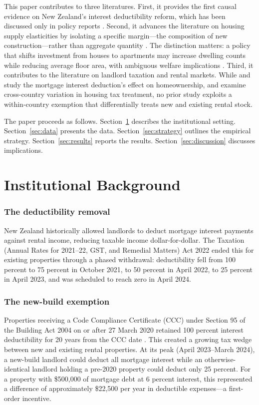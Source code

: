 \documentclass[12pt]{article}
\begin{document}
This paper contributes to three literatures. First, it provides the first causal evidence on New Zealand's interest deductibility reform, which has been discussed only in policy reports \citep{MBIE2023, RBNZ2022}. Second, it advances the literature on housing supply elasticities by isolating a specific margin---the composition of new construction---rather than aggregate quantity \citep{Saiz2010, GlaeserGyourko2005}. The distinction matters: a policy that shifts investment from houses to apartments may increase dwelling counts while reducing average floor area, with ambiguous welfare implications \citep{Albouy2016}. Third, it contributes to the literature on landlord taxation and rental markets. While \citet{GlaeserShapiro2003} and \citet{HilberTurner2014} study the mortgage interest deduction's effect on homeownership, and \citet{FaticaPrammer2018} examine cross-country variation in housing tax treatment, no prior study exploits a within-country exemption that differentially treats new and existing rental stock.

The paper proceeds as follows. Section~\ref{sec:background} describes the institutional setting. Section~\ref{sec:data} presents the data. Section~\ref{sec:strategy} outlines the empirical strategy. Section~\ref{sec:results} reports the results. Section~\ref{sec:discussion} discusses implications.


\section{Institutional Background}
\label{sec:background}

\subsubsection*{The deductibility removal} New Zealand historically allowed landlords to deduct mortgage interest payments against rental income, reducing taxable income dollar-for-dollar. The Taxation (Annual Rates for 2021--22, GST, and Remedial Matters) Act 2022 ended this for existing properties through a phased withdrawal: deductibility fell from 100 percent to 75 percent in October 2021, to 50 percent in April 2022, to 25 percent in April 2023, and was scheduled to reach zero in April 2024.

\subsubsection*{The new-build exemption} Properties receiving a Code Compliance Certificate (CCC) under Section 95 of the Building Act 2004 on or after 27 March 2020 retained 100 percent interest deductibility for 20 years from the CCC date \citep{IRD2022}. This created a growing tax wedge between new and existing rental properties. At its peak (April 2023--March 2024), a new-build landlord could deduct all mortgage interest while an otherwise-identical landlord holding a pre-2020 property could deduct only 25 percent. For a property with \$500,000 of mortgage debt at 6 percent interest, this represented a difference of approximately \$22,500 per year in deductible expenses---a first-order incentive.
\end{document}
